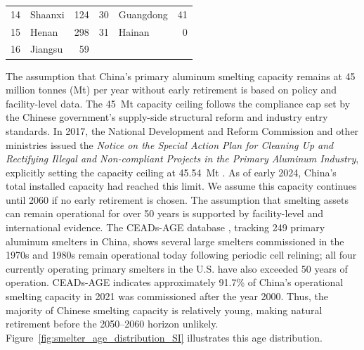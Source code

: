 \documentclass[preprint,12pt]{elsarticle}
\begin{document}
\begin{table}[htbp]
\begin{tabular}{rlrrlr}
    14                          & Shaanxi        & 124                                                                                               & 30                          & Guangdong & 41                                                                                                \\
    15                          & Henan          & 298                                                                                               & 31                          & Hainan    & 0                                                                                                 \\
    16                          & Jiangsu        & 59                                                                                                & \multicolumn{1}{l}{}        &           & \multicolumn{1}{l}{}                                                                              \\ \hline
    \end{tabular}
\end{table}


The assumption that China's primary aluminum smelting capacity remains at 45 million tonnes (Mt) per year without early retirement is based on policy and facility-level data. The 45~Mt capacity ceiling follows the compliance cap set by the Chinese government's supply-side structural reform and industry entry standards. In 2017, the National Development and Reform Commission and other ministries issued the \textit{Notice on the Special Action Plan for Cleaning Up and Rectifying Illegal and Non-compliant Projects in the Primary Aluminum Industry}, explicitly setting the capacity ceiling at 45.54~Mt \citep{ndrc_al_capacity_ceiling_2017}. As of early 2024, China's total installed capacity had reached this limit. We assume this capacity continues until 2060 if no early retirement is chosen. The assumption that smelting assets can remain operational for over 50 years is supported by facility-level and international evidence. The CEADs-AGE database \citep{tan_different_2025}, tracking 249 primary aluminum smelters in China, shows several large smelters commissioned in the 1970s and 1980s remain operational today following periodic cell relining; all four currently operating primary smelters in the U.S. have also exceeded 50 years of operation. CEADs-AGE indicates approximately 91.7\% of China's operational smelting capacity in 2021 was commissioned after the year 2000. Thus, the majority of Chinese smelting capacity is relatively young, making natural retirement before the 2050--2060 horizon unlikely. Figure~\ref{fig:smelter_age_distribution_SI} illustrates this age distribution.
\end{document}
